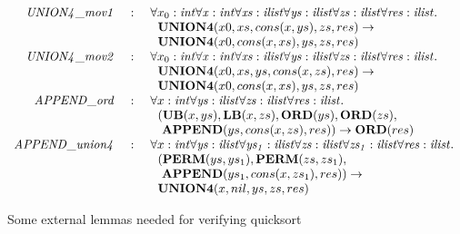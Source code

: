 \documentclass{llncs}
\begin{document}
\begin{figure}[thp]
\[\begin{array}{rcl}
{\it UNION4\_mov1}  &~:~&
\forall x_0:\it int\forall x:\it int\forall xs:{\it ilist}\forall ys:{\it ilist}\forall zs:{\it ilist}\forall res:{\it ilist}.~\\
                   & &
\kern6pt{\bf UNION4} (x0, xs, cons (x, ys), zs, res)\rightarrow\\
                   & &
\kern6pt{\bf UNION4} (x0, cons (x, xs), ys, zs, res) \\
{\it UNION4\_mov2}  &~:~&
\forall x_0:\it int\forall x:\it int\forall xs:{\it ilist}\forall ys:{\it ilist}\forall zs:{\it ilist}\forall res:{\it ilist}.~\\
                   & &
\kern6pt{\bf UNION4} (x0, xs, ys, cons (x, zs), res)\rightarrow\\
                   & &
\kern6pt{\bf UNION4} (x0, cons (x, xs), ys, zs, res) \\
{\it APPEND\_ord} &~:~&
\forall x:\it int\forall ys:{\it ilist}\forall zs:{\it ilist}\forall res:{\it ilist}.~\\
                  & &
\kern6pt({\bf UB} (x, ys), {\bf LB} (x, zs), {\bf ORD}(ys), {\bf ORD}(zs), \\
                  & &
\kern6pt~{\bf APPEND} (ys, cons (x, zs), res)) \rightarrow {\bf ORD}(res) \\
{\it APPEND\_union4} &~:~&
\forall x:\it int\forall ys:{\it ilist}\forall ys_1:{\it ilist}\forall
zs:{\it ilist}\forall zs_1:{\it ilist}\forall res:{\it ilist}.~\\
                  & &
\kern6pt({\bf PERM}(ys, ys_1), {\bf PERM} (zs, zs_1), \\
                  & &
\kern6pt~{\bf APPEND} (ys_1, cons (x, zs_1), res))\rightarrow\\
                  & &
\kern6pt{\bf UNION4}(x, nil, ys, zs, res) \\
\end{array}\]
\caption{Some external lemmas needed for verifying quicksort}
\label{figure:quicksort_extern_lemmas}
\end{figure}
\end{document}
